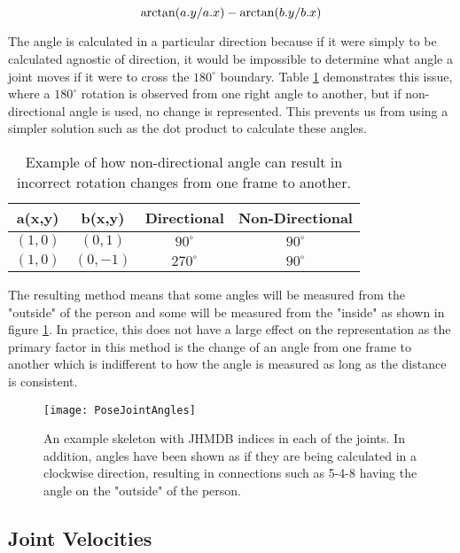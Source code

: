 \begin{equation}
	\label{eqn:angle-calculation}
	\centering
	\arctan(a.y/a.x) - \arctan(b.y/b.x)
\end{equation}

The angle is calculated in a particular direction because if it were simply to be calculated agnostic of direction, it would be impossible to determine what angle a joint moves if it were to cross the $180^\circ$ boundary. Table \ref{tab:directed-angle-example} demonstrates this issue, where a $180^\circ$ rotation is observed from one right angle to another, but if non-directional angle is used, no change is represented. This prevents us from using a simpler solution such as the dot product to calculate these angles.

\begin{table}[ht]
	\centering
	\begin{tabular}{||c c c c||} 
		\hline
		\textbf{a(x,y)} & \textbf{b(x,y)} & \textbf{Directional} & \textbf{Non-Directional} \\ [0.5ex] 
		\hline\hline
		$(1,0)$ & $(0,1)$ & $90^\circ$ & $90^\circ$ \\
		\hline
		$(1,0)$ & $(0,-1)$ & $270^\circ$ & $90^\circ$ \\
		\hline
	\end{tabular}
	\caption{Example of how non-directional angle can result in incorrect rotation changes from one frame to another.}
	\label{tab:directed-angle-example}
\end{table}

The resulting method means that some angles will be measured from the "outside" of the person and some will be measured from the "inside" as shown in figure \ref{fig:pose-joint-angles}. In practice, this does not have a large effect on the representation as the primary factor in this method is the change of an angle from one frame to another which is indifferent to how the angle is measured as long as the distance is consistent.

\begin{figure}[ht]
	\texttt{[image: PoseJointAngles]}
	\centering
	\caption{An example skeleton with JHMDB indices in each of the joints. In addition, angles have been shown as if they are being calculated in a clockwise direction, resulting in connections such as 5-4-8 having the angle on the "outside" of the person.}
	\label{fig:pose-joint-angles}
\end{figure}

\subsection{Joint Velocities}
\label{sec:joint-velocities}

